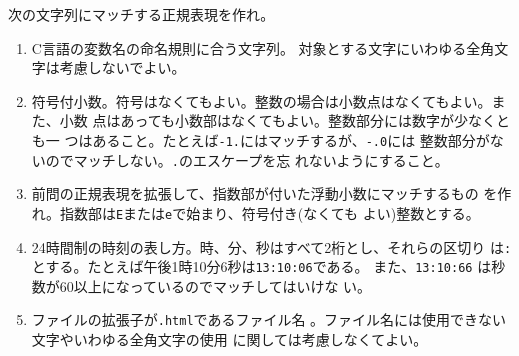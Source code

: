 \begin{Prob}\upshape\Must
次の文字列にマッチする正規表現を作れ。
\begin{enumerate}
 \item C言語の変数名の命名規則に合う文字列\ifText 。
			 対象とする文字にいわゆる全角文字は考慮しないでよい。\\[0.05\textheight]\fi
 \item 符号付小数。符号はなくてもよい。整数の場合は小数点はなくてもよい。また、小数
       点はあっても小数部はなくてもよい。整数部分には数字が少なくとも一
       つはあること。たとえば\Verb+-1.+にはマッチするが、\Verb+-.0+には
       整数部分がないのでマッチしない。\Verb+.+のエスケープを忘
       れないようにすること。\ifText\\[0.05\textheight]\fi
 \item 前問の正規表現を拡張して、指数部が付いた浮動小数にマッチするもの
       を作れ。指数部は\Verb+E+または\Verb+e+で始まり、符号付き(なくても
       よい)整数とする。\ifText\\[0.05\textheight]\fi
 \item 24時間制の時刻の表し方。時、分、秒はすべて2桁とし、それらの区切り
       は\Verb+:+とする。たとえば午後1時10分6秒は\Verb+13:10:06+である。
  また、\Verb+13:10:66+ は秒数が60以上になっているのでマッチしてはいけな
       い。
       \ifText\\[0.05\textheight]\fi
 \item ファイルの拡張子が\texttt{.html}であるファイル名
			 \ifText 。ファイル名には使用できない文字やいわゆる全角文字の使用
			 に関しては考慮しなくてよい。\\[0.05\textheight]\fi
\end{enumerate}
\end{Prob}
